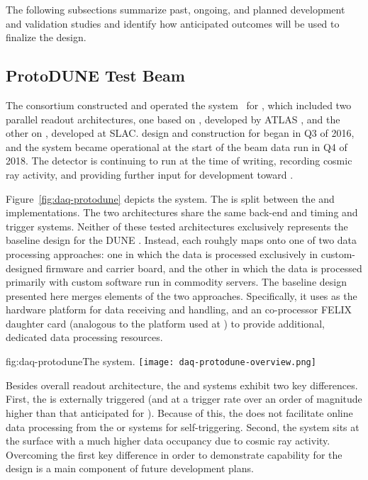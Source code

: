 The following subsections summarize past, ongoing, and planned
development and validation studies and identify how anticipated outcomes
will be used to finalize the  design.

\subsection{ProtoDUNE Test Beam}

\label{sec:fd-daq:protodune}

The   consortium constructed and operated the  system~\cite{Sipos:2018auh} for , which included two parallel  readout architectures, one based on , developed by ATLAS \cite{atlas-felix}, and the other on , developed at SLAC.  design and construction for  began in Q3 of 2016, and the system became operational at the start of the beam data run in Q4 of 2018. The detector is continuing to run at the time of writing, recording cosmic ray activity, and providing further input for  development toward . 

Figure~\ref{fig:daq-protodune} depicts the   system. 
The  is split between the  and  implementations. The two architectures share the same back-end and timing and trigger systems. 
Neither of these tested architectures exclusively represents the baseline design for the DUNE . Instead, each rouhgly maps onto one of two data processing approaches: one in which the data is processed exclusively in custom-designed  firmware and carrier board, and the other in which the data is processed primarily with custom software run in commodity servers. The baseline design presented here merges elements of the two approaches. Specifically, it uses  as the hardware platform for data receiving and handling, and an co-processor FELIX daughter card (analogous to the  platform used at ) to provide additional, dedicated data processing resources.


\begin{dunefigure}{fig:daq-protodune}{The   system.}
  \texttt{[image: daq-protodune-overview.png]}
\end{dunefigure}

Besides overall readout architecture, the  and   systems exhibit two key differences. 
First, the   is externally triggered (and at a trigger rate over an order of magnitude higher than that anticipated for ). Because of this, the   does not facilitate online data processing from the  or  systems for self-triggering. 
Second, the  system sits at the surface with a much higher data occupancy due to cosmic ray activity.
Overcoming the first key difference in order to demonstrate  capability for the   design is a main component of future  development plans.

